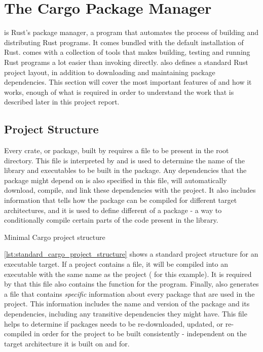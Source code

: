 
\section{The Cargo Package Manager}
\label{sec:cargo}

\cargo is Rust's package manager, a program that automates the process of building and distributing Rust programs.
It comes bundled with the default installation of Rust.
\cargo comes with a collection of tools that makes building, testing and running Rust programs a lot easier than invoking \rustc directly.
\cargo also defines a standard Rust project layout, in addition to downloading and maintaining package dependencies.
This section will cover the most important features of \cargo and how it works, enough of what is required in order to understand the work that is described later in this project report.

\subsection{Project Structure}
\label{ssub:project_structure}

Every crate, or package, built by \cargo requires a  file to be present in the root directory.
This file is interpreted by \cargo and is used to determine the name of the library and executables to be built in the package.
Any dependencies that the package might depend on is also specified in this file, \cargo will automatically download, compile, and link these dependencies with the project.
It also includes information that tells \cargo how the package can be compiled for different target architectures, and it is used to define different  of a package - a way to conditionally compile certain parts of the code present in the library.

\begin{listing}
\caption{Minimal Cargo project structure}
\label{lst:standard_cargo_project_structure}
\end{listing}

\autoref{lst:standard_cargo_project_structure} shows a standard \cargo project structure for an executable target.
If a project contains a  file, it will be compiled into an executable with the same name as the project ( for this example).
It is required by \cargo that this file also contains the \main function for the program.
Finally, \cargo also generates a  file that contains \emph{specific} information about every package that are used in the project.
This information includes the name and version of the package and its dependencies, including any transitive dependencies they might have.
This file helps \cargo to determine if packages needs to be re-downloaded, updated, or re-compiled in order for the project to be built consistently - independent on the target architecture it is built on and for.

